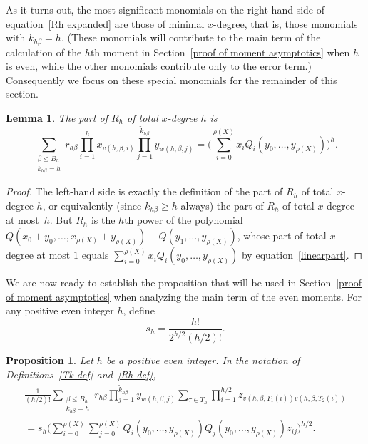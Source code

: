 \documentclass[12pt,reqno]{amsart}
\newtheorem{lemma}[theorem]{Lemma}
\newtheorem{prop}[theorem]{Proposition}
\theoremstyle{definition}
\begin{document}
As it turns out, the most significant monomials on the right-hand side of equation~\eqref{Rh expanded} are those of minimal $x$-degree, that is, those monomials with $k_{h\beta}=h$. (These monomials will contribute to the main term of the calculation of the $h$th moment in Section~\ref{proof of moment asymptotics} when $h$ is even, while the other monomials contribute only to the error term.) Consequently we focus on these special monomials for the remainder of this section.

\begin{lemma} \label{Rh small part lemma}
The part of $R_h$ of total $x$-degree $h$ is
\begin{equation} \label{total x degree forms}
\sum_{\substack{\beta\le B_h \\ k_{h\beta}=h}} r_{h\beta} \prod_{i=1}^h x_{v(h,\beta, i)} \prod_{j=1}^{\tilde k_{h\beta}} y_{w(h,\beta,j)} = \bigg(\sum_{i = 0}^{\rho(X)} x_iQ_i(y_0, \ldots, y_{\rho(X)}) \bigg)^h.
\end{equation}
\end{lemma}

\begin{proof}
The left-hand side is exactly the definition of the part of $R_h$ of total $x$-degree $h$, or equivalently (since $k_{h\beta}\ge h$ always) the part of $R_h$ of total $x$-degree at most~$h$. But $R_h$ is the $h$th power of the polynomial $Q(x_0+y_0,\dots,x_{\rho(X)}+y_{\rho(X)}) - Q(y_1,\dots,y_{\rho(X)})$, whose part of total $x$-degree at most $1$ equals $\sum_{i = 0}^{\rho(X)} x_iQ_i(y_0, \ldots, y_{\rho(X)})$ by equation~\eqref{linearpart}.
\end{proof}

We are now ready to establish the proposition that will be used in Section~\ref{proof of moment asymptotics} when analyzing the main term of the even moments. For any positive even integer $h$, define
\begin{equation} \label{s_h def}
s_h = \frac{h!}{2^{h/2}(h/2)!}.
\end{equation}

\begin{prop} \label{Rh magic Phi prop}
Let $h$ be a positive even integer. In the notation of Definitions~\ref{Tk def} and~\ref{Rh def},
\begin{multline} \label{after applying Phi forms}
\frac1{(h/2)!} \sum_{\substack{\beta\le B_h \\ k_{h\beta}=h}} r_{h\beta} \prod_{j=1}^{\tilde k_{h\beta}} y_{w(h,\beta, j)} \sum_{\tau\in T_h} \prod_{i=1}^{h/2} z_{v(h,\beta,\Upsilon_1(i))v(h,\beta,\Upsilon_2(i))} \\
= s_h \bigg( \sum_{i = 0}^{\rho(X)} \sum_{j = 0}^{\rho(X)} Q_i(y_0, \ldots, y_{\rho(X)})Q_j(y_0, \ldots, y_{\rho(X)}) z_{ij} \bigg)^{h/2}.
\end{multline}
\end{prop}
\end{document}
